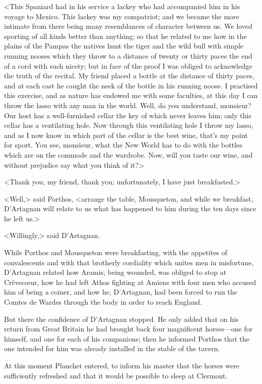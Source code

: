 <This Spaniard had in his service a lackey who had accompanied him in his voyage to Mexico. This lackey was my compatriot; and we became the more intimate from there being many resemblances of character between us. We loved sporting of all kinds better than anything; so that he related to me how in the plains of the Pampas the natives hunt the tiger and the wild bull with simple running nooses which they throw to a distance of twenty or thirty paces the end of a cord with such nicety; but in face of the proof I was obliged to acknowledge the truth of the recital. My friend placed a bottle at the distance of thirty paces, and at each cast he caught the neck of the bottle in his running noose. I practised this exercise, and as nature has endowed me with some faculties, at this day I can throw the lasso with any man in the world. Well, do you understand, monsieur? Our host has a well-furnished cellar the key of which never leaves him; only this cellar has a ventilating hole. Now through this ventilating hole I throw my lasso, and as I now know in which part of the cellar is the best wine, that's my point for sport. You see, monsieur, what the New World has to do with the bottles which are on the commode and the wardrobe. Now, will you taste our wine, and without prejudice say what you think of it?> 

<Thank you, my friend, thank you; unfortunately, I have just breakfasted.> 

<Well,> said Porthos, <arrange the table, Mousqueton, and while we breakfast, D'Artagnan will relate to us what has happened to him during the ten days since he left us.> 

<Willingly,> said D'Artagnan. 

While Porthos and Mousqueton were breakfasting, with the appetites of convalescents and with that brotherly cordiality which unites men in misfortune, D'Artagnan related how Aramis, being wounded, was obliged to stop at Crèvecœur, how he had left Athos fighting at Amiens with four men who accused him of being a coiner, and how he, D'Artagnan, had been forced to run the Comtes de Wardes through the body in order to reach England. 

But there the confidence of D'Artagnan stopped. He only added that on his return from Great Britain he had brought back four magnificent horses—one for himself, and one for each of his companions; then he informed Porthos that the one intended for him was already installed in the stable of the tavern. 

At this moment Planchet entered, to inform his master that the horses were sufficiently refreshed and that it would be possible to sleep at Clermont. 

